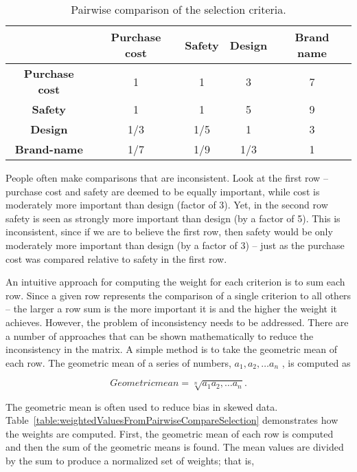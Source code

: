 \begin{table}[h]
\caption{Pairwise comparison of the selection criteria.}
\label{table:pairwiseCompareSelection}

\begin{tabular}{|c|c|c|c|c|}
\hline
\rowcolor{Gray}
			 & \textbf{Purchase cost}  & \textbf{Safety} & \textbf{Design} & \textbf{Brand name} \\ \hline
\textbf{Purchase cost} & 1 & 1 & 3 & 7 \\ \hline
\textbf{Safety} & 1 & 1 & 5 & 9 \\ \hline
\textbf{Design} & 1/3 & 1/5 & 1 & 3 \\ \hline
\textbf{Brand-name} & 1/7 & 1/9 & 1/3 & 1 \\ \hline
\end{tabular}
\end{table}

People often make comparisons that are inconsistent. Look at the first
row -- purchase cost and safety are deemed to be equally important,
while cost is moderately more important than design (factor of 3). Yet,
in the second row safety is seen as strongly more important than design
(by a factor of 5). This is inconsistent, since if we are to believe the
first row, then safety would be only moderately more important than
design (by a factor of 3) -- just as the purchase cost was compared
relative to safety in the first row.

An intuitive approach for computing the weight for each criterion is to
sum each row. Since a given row represents the comparison of a single
criterion to all others -- the larger a row sum is the more important it
is and the higher the weight it achieves. However, the problem of
inconsistency needs to be addressed. There are a number of approaches
that can be shown mathematically to reduce the inconsistency in the
matrix. A simple method is to take the geometric mean of each row. The
geometric mean of a series of numbers, $a_{1}, a_{2}, \hdots a_{n}$
, is computed as

\begin{equation}
\label{equ:geometricMean}
Geometric mean = \sqrt[n]{a_{1} a_{2}, \hdots a_{n}}.
\end{equation}

The geometric mean is often used to reduce bias in skewed data. 
Table~\ref{table:weightedValuesFromPairwiseCompareSelection}
 demonstrates how the weights are computed. First, the geometric mean
of each row is computed and then the sum of the geometric means is
found. The mean values are divided by the sum to produce a normalized
set of weights; that is,

